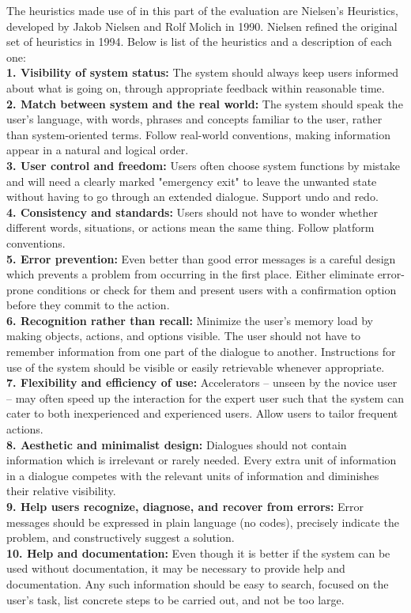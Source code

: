 The heuristics made use of in this part of the evaluation are Nielsen's Heuristics, developed by Jakob Nielsen and Rolf Molich in 1990\cite{tenheuristics}. Nielsen refined the original set of heuristics in 1994\cite{tenheuristics}. Below is list of the heuristics and a description of each one:
\\
\textbf{1. Visibility of system status:}
The system should always keep users informed about what is going on, through appropriate feedback within reasonable time.
\\
\textbf{2. Match between system and the real world:}
The system should speak the user's language, with words, phrases and concepts familiar to the user, rather than system-oriented terms. Follow real-world conventions, making information appear in a natural and logical order.
\\
\textbf{3. User control and freedom:}
Users often choose system functions by mistake and will need a clearly marked "emergency exit" to leave the unwanted state without having to go through an extended dialogue. Support undo and redo.
\\
\textbf{4. Consistency and standards:}
Users should not have to wonder whether different words, situations, or actions mean the same thing. Follow platform conventions.
\\
\textbf{5. Error prevention:}
Even better than good error messages is a careful design which prevents a problem from occurring in the first place. Either eliminate error-prone conditions or check for them and present users with a confirmation option before they commit to the action.
\\
\textbf{6. Recognition rather than recall:}
Minimize the user's memory load by making objects, actions, and options visible. The user should not have to remember information from one part of the dialogue to another. Instructions for use of the system should be visible or easily retrievable whenever appropriate.
\\
\textbf{7. Flexibility and efficiency of use:}
Accelerators -- unseen by the novice user -- may often speed up the interaction for the expert user such that the system can cater to both inexperienced and experienced users. Allow users to tailor frequent actions.
\\
\textbf{8. Aesthetic and minimalist design:}
Dialogues should not contain information which is irrelevant or rarely needed. Every extra unit of information in a dialogue competes with the relevant units of information and diminishes their relative visibility.
\\
\textbf{9. Help users recognize, diagnose, and recover from errors:}
Error messages should be expressed in plain language (no codes), precisely indicate the problem, and constructively suggest a solution.
\\
\textbf{10. Help and documentation:}
Even though it is better if the system can be used without documentation, it may be necessary to provide help and documentation. Any such information should be easy to search, focused on the user's task, list concrete steps to be carried out, and not be too large.\\

